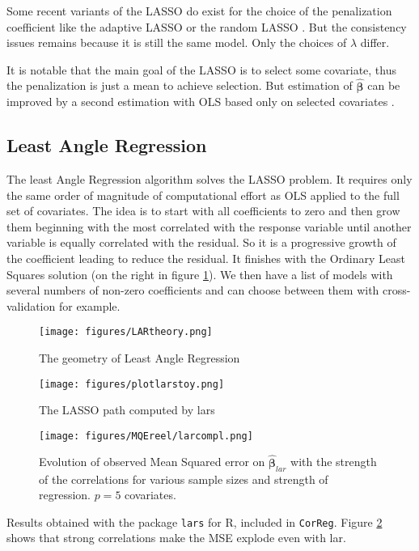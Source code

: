 \documentclass[12pt,a4paper]{report}
\begin{document}

			 Some recent variants of the \textsc{LASSO} do exist for the choice of the penalization coefficient like the adaptive \textsc{LASSO} \cite{zou2006adaptive} or the random \textsc{LASSO} \cite{wang2011random}.  But the consistency issues remains because it is still the same model. Only the choices of $\lambda$ differ.
			 
			 It is notable that the main goal of the LASSO is to select some covariate, thus the penalization is just a mean to achieve selection. But estimation of $\hat{\boldsymbol{\beta}}$ can be improved by a second estimation with OLS based only on selected covariates \cite{SAM10088}.
		\subsection{Least Angle Regression}
		The least Angle Regression algorithm solves the LASSO problem.
		It requires only the same order of magnitude of computational effort as \textsc{OLS} applied to the full set of covariates.
		The idea is to start with all coefficients to zero and then grow them beginning with the most correlated with the response variable until another variable is equally correlated with the residual. So it is a progressive growth of the coefficient leading to reduce the residual. It finishes with the Ordinary Least Squares solution (on the right in figure \ref{plotlarstoy}). We then have a list of models with several numbers of non-zero coefficients and can choose between them with cross-validation for example.
\begin{figure}[h!]
	\centering
		  \texttt{[image: figures/LARtheory.png]}
		\caption{The geometry of Least Angle Regression}
	\end{figure}
				
\begin{figure}[h!]
	\centering
		  \texttt{[image: figures/plotlarstoy.png]}
		\caption{The LASSO path computed by lars}\label{plotlarstoy}
	\end{figure}			
	
		 \begin{figure}
	 \centering
	  \texttt{[image: figures/MQEreel/larcompl.png]}
	  \caption{Evolution of observed Mean Squared error on $\hat{\boldsymbol{\beta}}_{lar}$ with the strength of the correlations for various sample sizes and strength of regression. $p=5$ covariates. } \label{MQElarcompl}
	\end{figure}
	Results obtained with the package {\tt lars} for R, included in {\tt CorReg}. Figure \ref{MQElarcompl} shows that strong correlations make the MSE explode even with lar. 
 	 
\end{document}
